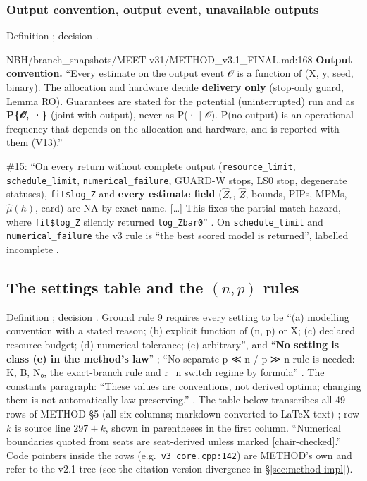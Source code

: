 \subsubsection{Output convention, output event, unavailable outputs}
Definition ; decision .
\begin{stmt}{NBH/branch_snapshots/MEET-v31/METHOD_v3.1_FINAL.md:168}
\textbf{Output convention.} ``Every estimate on the output event 𝒪 is a function of (X, y, seed, binary). The allocation and hardware
decide \textbf{delivery only} (stop-only guard, Lemma RO). Guarantees are stated for the potential (uninterrupted) run and as
\textbf{P\{𝒪, ·\}} (joint with output), never as P(· | 𝒪). P(no output) is an operational frequency that depends on the allocation and
hardware, and is reported with them (V13).''
\end{stmt}
\#15: ``On every return without complete output (\texttt{resource\_limit}, \texttt{schedule\_limit}, \texttt{numerical\_failure},
GUARD-W stops, LS0 stop, degenerate statuses), \texttt{fit\$log\_Z} and \textbf{every estimate field} ($\hat Z_r$, $\hat Z$, bounds, PIPs,
MPMs, $\hat\mu(h)$, card) are NA by exact name. [\dots] This fixes the partial-match hazard, where \texttt{fit\$log\_Z} silently
returned \texttt{log\_Zbar0}'' . On \texttt{schedule\_limit} and
\texttt{numerical\_failure} the v3 rule is ``the best scored model is returned'', labelled incomplete
.

\subsection{The settings table and the \texorpdfstring{$(n,p)$}{(n,p)} rules}\label{sec:method-settings}

Definition ; decision . Ground rule 9 requires every setting to be ``(a) modelling convention with a
stated reason; (b) explicit function of (n, p) or X; (c) declared resource budget; (d) numerical tolerance; (e)
arbitrary'', and ``\textbf{No setting is class (e) in the method's law}''
; ``No separate p ≪ n / p ≫ n rule is needed: K, B, N₀, the
exact-branch rule and r\_n switch regime by formula'' . The
constants paragraph: ``These values are conventions, not derived optima; changing them is not automatically
law-preserving.'' . The table below transcribes all 49 rows of
METHOD \S5 (all six columns; markdown converted to LaTeX text) ;
row $k$ is source line $297+k$, shown in parentheses in the first column. ``Numerical boundaries quoted from seats are
seat-derived unless marked [chair-checked].'' Code pointers inside the rows (e.g.\ \texttt{v3\_core.cpp:142}) are METHOD's own
and refer to the v2.1 tree (see the citation-version divergence in \S\ref{sec:method-impl}).

